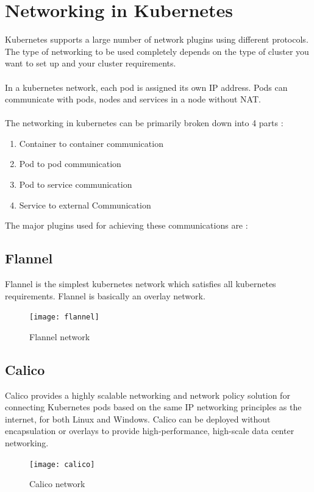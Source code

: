 \documentclass[12pt]{report}
\begin{document}
\section{Networking in Kubernetes}
Kubernetes supports a large number of network plugins using different protocols. The type of networking to be used completely depends on the type of cluster you want to set up and your cluster requirements.\\\\
In a kubernetes network, each pod is assigned its own IP address. Pods can communicate with pods, nodes and services in a node without NAT. \\\\
The networking in kubernetes can be primarily broken down into 4 parts :
\begin{enumerate}
	\item Container to container communication
	\item Pod to pod communication
	\item Pod to service communication
	\item Service to external Communication
\end{enumerate}
The major plugins used for achieving these communications are :
\subsection{Flannel}
Flannel is the simplest kubernetes network  which satisfies all kubernetes requirements. Flannel is basically an overlay network.
\begin{figure}[h!]
	\begin{center}
		\texttt{[image: flannel]}
		\caption{Flannel network \cite{Flannel}}
	\end{center}
\end{figure}
\subsection{Calico}
Calico provides a highly scalable networking and network policy solution for connecting Kubernetes pods based on the same IP networking principles as the internet, for both Linux and Windows. Calico can be deployed without encapsulation or overlays to provide high-performance, high-scale data center networking.\\
\begin{figure}[h!]
	\begin{center}
		\texttt{[image: calico]}
		\caption{Calico network \cite{Calico}}
	\end{center}
\end{figure}
\end{document}
